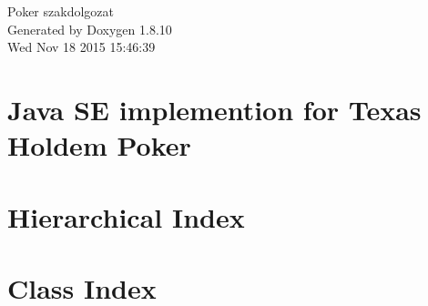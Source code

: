 \documentclass[twoside]{book}
\newcommand{\+}{\discretionary{\mbox{\scriptsize$\hookleftarrow$}}{}{}}
\newcommand{\clearemptydoublepage}{%
  \newpage{\pagestyle{empty}\cleardoublepage}%
}
\begin{document}
\hypersetup{pageanchor=false,
             bookmarks=true,
             bookmarksnumbered=true,
             pdfencoding=unicode
            }
\begin{titlepage}
\vspace*{7cm}
\begin{center}%
{\Large Poker szakdolgozat }\\
\vspace*{1cm}
{\large Generated by Doxygen 1.8.10}\\
\vspace*{0.5cm}
{\small Wed Nov 18 2015 15:46:39}\\
\end{center}
\end{titlepage}
\clearemptydoublepage
\tableofcontents
\clearemptydoublepage
{}
\hypersetup{pageanchor=true}

\chapter{Java S\+E implemention for Texas Hold\textquotesingle{}em Poker}
\label{md_javapokertexasholdem__r_e_a_d_m_e}
\hypertarget{md_javapokertexasholdem__r_e_a_d_m_e}{}

\chapter{Hierarchical Index}

\chapter{Class Index}

\end{document}
